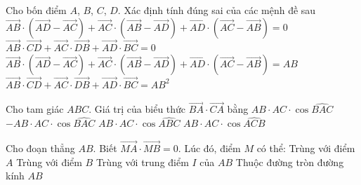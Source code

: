\begin{ex}%
	Cho bốn điểm $A$, $B$, $C$, $D$. Xác định  tính đúng sai của các mệnh đề sau
	\choiceTF 
		{\True $\overrightarrow{AB}\cdot(\overrightarrow{AD}-\overrightarrow{AC})+\overrightarrow{AC}\cdot(\overrightarrow{AB}-\overrightarrow{AD})+\overrightarrow{AD}\cdot(\overrightarrow{AC}-\overrightarrow{AB})=0$} 
		{\True 
		$\overrightarrow{AB}\cdot\overrightarrow{CD}+\overrightarrow{AC}\cdot\overrightarrow{DB}+\overrightarrow{AD}\cdot\overrightarrow{BC}=0$} 
		{ $\overrightarrow{AB}\cdot(\overrightarrow{AD}-\overrightarrow{AC})+\overrightarrow{AC}\cdot(\overrightarrow{AB}-\overrightarrow{AD})+\overrightarrow{AD}\cdot(\overrightarrow{AC}-\overrightarrow{AB})=AB$} 
		{  $\overrightarrow{AB}\cdot\overrightarrow{CD}+\overrightarrow{AC}\cdot\overrightarrow{DB}+\overrightarrow{AD}\cdot\overrightarrow{BC}=AB^2$}
\end{ex}

\begin{ex}%
	Cho tam  giác $ABC$. Giá trị của biểu thức $\overrightarrow{BA}\cdot\overrightarrow{CA}$ bằng
	\choiceTF 
		 {\True $AB\cdot AC\cdot\cos\widehat{BAC}$}
		{$-AB\cdot  AC\cdot\cos\widehat{BAC}$}
		 {$AB\cdot AC\cdot\cos\widehat{ABC}$}
		 {$AB\cdot AC\cdot\cos\widehat{ACB}$}
\end{ex}

\begin{ex}%
	Cho đoạn thẳng $AB$. Biết $\overrightarrow{MA}\cdot\overrightarrow{MB}=0$. Lúc  đó, điểm $M$ có thể:
	 \choiceTF
		{\True Trùng  với điểm $A$}
		{\True  Trùng với điểm $B$}
		{Trùng với trung điểm $I$  của $AB$}
		 {\True Thuộc đường tròn đường kính $AB$}
\end{ex}

